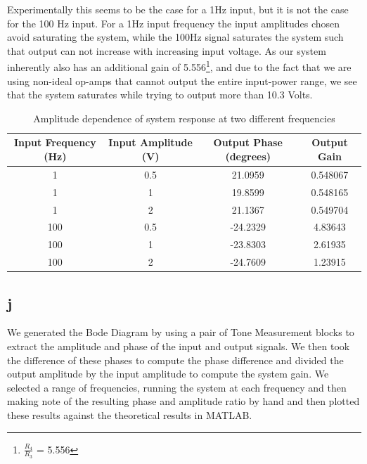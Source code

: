 \documentclass{article}
\theoremstyle{plain}
\theoremstyle{definition}
\theoremstyle{remark}
\begin{document}
Experimentally this seems to be the case for a 1Hz input, but it is not the case for the 100 Hz input.  For a 1Hz input frequency the input amplitudes chosen avoid saturating the system, while the 100Hz signal saturates the system such that output can not increase with increasing input voltage. As our system inherently also has an additional gain of 5.556\footnote{$\frac{R_4}{R_3}$ = 5.556}, and due to the fact that we are using non-ideal op-amps that cannot output the entire input-power range, we see that the system saturates while trying to output more than 10.3 Volts.


\begin{table}[hbt]
\begin{center}
    \begin{tabular}{|c|c|c|c|}
        \hline
        Input Frequency (Hz) & Input Amplitude (V) & Output Phase (degrees) & Output Gain \\ \hline
        1                    & 0.5             & 21.0959                & 0.548067               \\ 
        1                    & 1               & 19.8599                & 0.548165               \\ 
        1                    & 2               & 21.1367                & 0.549704               \\ 
        100                  & 0.5             & -24.2329               & 4.83643                \\ 
        100                  & 1               & -23.8303               & 2.61935                \\ 
        100                  & 2               & -24.7609               & 1.23915                \\
        \hline
    \end{tabular}
\end{center}
\caption{Amplitude dependence of system response at two different frequencies}
\label{q1_it}
\end{table}

\subsection*{j}

We generated the Bode Diagram by using a pair of Tone Measurement blocks to extract the amplitude and phase of the input and output signals.  We then took the difference of these phases to compute the phase difference and divided the output amplitude by the input amplitude to compute the system gain.  We selected a range of frequencies, running the system at each frequency and then making note of the resulting phase and amplitude ratio by hand and then plotted these results against the theoretical results in MATLAB.
\end{document}
